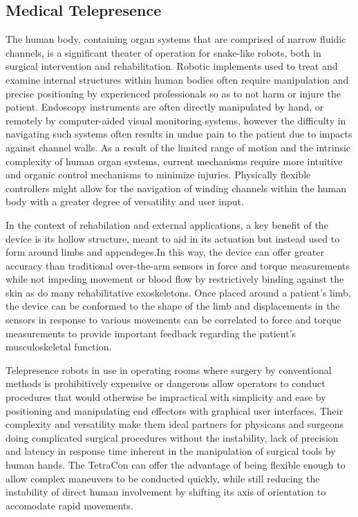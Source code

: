 \documentclass[11pt]{article}
\begin{document}
\subsection{Medical Telepresence}

The human body, containing organ systems that are comprised of narrow fluidic channels, is a significant theater of operation for snake-like robots, both in surgical intervention and rehabilitation. Robotic implements used to treat and examine internal structures within human bodies often require manipulation and precise positioning by experienced professionals so as to not harm or injure the patient. Endoscopy instruments are often directly manipulated by hand, or remotely by computer-aided visual monitoring systems, however the difficulty in navigating such systems often results in undue pain to the patient due to impacts against channel walls. As a result of the limited range of motion and the intrinsic complexity of human organ systems, current mechanisms require more intuitive and organic control mechanisms to minimize injuries. Physically flexible controllers might allow for the navigation of winding channels within the human body with a greater degree of versatility and user input.

 In the context of rehabilation and external applications, a key benefit of the device is its hollow structure, meant to aid in its actuation but instead used to form around limbs and appendeges.In this way, the device can offer greater accuracy than traditional over-the-arm sensors in force and torque measurements while not impeding movement or blood flow by restrictively binding against the skin as do many rehabilitative exoskeletons. Once placed around a patient's limb, the device can be conformed to the shape of the limb and displacements in the sensors in response to various movements can be correlated to force and torque measurements to provide important feedback regarding the patient's musculoskeletal function.

 Telepresence robots in use in operating rooms where surgery by conventional methods is prohibitively expensive or dangerous allow operators to conduct procedures that would otherwise be impractical with simplicity and ease by positioning and manipulating end effectors with graphical user interfaces. Their complexity and versatility make them ideal partners for physicans and surgeons doing complicated surgical procedures without the instability, lack of precision and latency in response time inherent in the manipulation of surgical tools by human hands. The TetraCon can offer the advantage of being flexible enough to allow complex maneuvers to be conducted quickly, while still reducing the instability of direct human involvement by shifting its axis of orientation to accomodate rapid movements.
\end{document}
